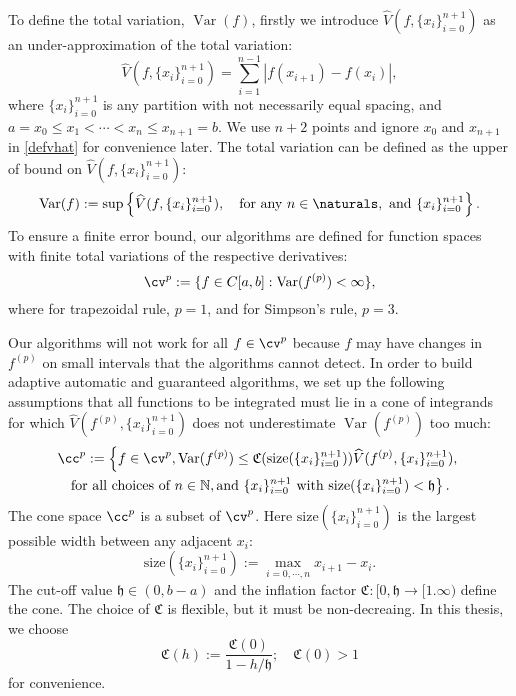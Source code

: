 \documentclass{iitthesis}
\DeclareMathOperator{\Var}{Var}
\theoremstyle{definition}
\theoremstyle{remark}
\begin{document}
To define the total variation, $\Var(f)$, firstly we introduce $\widehat{V}(f,\{x_i\}_{i=0}^{n+1})$ as an under-approximation of the total variation:
\begin{equation}\label{defvhat}
    \widehat{V}(f,\{x_i\}_{i=0}^{n+1})=\sum_{i=1}^{n-1}|f(x_{i+1})-f(x_{i})|,
\end{equation}
where $\{x_i\}_{i=0}^{n+1}$ is any partition with not necessarily equal spacing, and $a=x_{0}\leq x_{1}<\cdots<x_{n}\leq x_{n+1}=b$.
We use $n+2$ points and ignore $x_0$ and $x_{n+1}$ in \eqref{defvhat} for convenience later.
The total variation can be defined as the upper of bound on $\widehat{V}(f,\{x_i\}_{i=0}^{n+1})$:
\begin{equation}\label{defvar}
  \Var(f) := \sup \left\{\widehat{V}(f,\{x_i\}_{i=0}^{n+1}), \quad \text{for any }n \in \naturals, \text{ and } \{x_i\}_{i=0}^{n+1}\right\}.
\end{equation}
To ensure a finite error bound, our algorithms are defined for function spaces with finite total variations of the respective derivatives:
\begin{equation}\label{defspace}
 \cv^{p}:=\{f\in C[a,b]: \Var(f^{(p)}) < \infty \},
\end{equation}
where for trapezoidal rule, $p=1$, and for Simpson's rule, $p=3$.

Our algorithms will not work for all $f \in \cv^{p}$ because $f$ may have changes in $f^{(p)}$ on small intervals that the algorithms cannot detect. In order to build adaptive automatic and guaranteed algorithms, we set up the following assumptions that all functions to be integrated must lie in a cone of integrands for which $\widehat{V}(f^{(p)},\{x_i\}_{i=0}^{n+1})$ does not underestimate $\Var(f^{(p)})$ too much:
\begin{multline}\label{defcone}
\cc^{p}:=\left\{f\in \cv^{p}, \Var(f^{(p)})\leq \mathfrak{C}(\text{size}(\{x_i\}_{i=0}^{n+1}))\widehat{V}(f^{(p)},\{x_i\}_{i=0}^{n+1}),\right.\\ \left.\text{for all choices of } n\in \mathbb{N}, \text{and }\{x_i\}_{i=0}^{n+1} \text{ with }\text{size}(\{x_i\}_{i=0}^{n+1})<\mathfrak{h}\right\}.
\end{multline}
The cone space $\cc^{p}$ is a subset of $\cv^{p}$. Here $\text{size}(\{x_i\}_{i=0}^{n+1})$ is the largest possible width between any adjacent $x_i$:
\begin{equation}\label{defsize}
  \text{size}(\{x_i\}_{i=0}^{n+1}):=\max_{i=0,\cdots, n} x_{i+1}-x_{i}.
\end{equation}
The cut-off value $\mathfrak{h} \in (0, b-a)$ and the inflation factor $\mathfrak{C}: [0,\mathfrak{h} \rightarrow [1.\infty)$ define the cone. The choice of $\mathfrak{C}$ is flexible, but it must be non-decreaing. In this thesis, we choose
\begin{equation}\label{definflationfactor}
  \mathfrak{C}(h):=\frac{\mathfrak{C}(0)}{1-h/\mathfrak{h}}; \quad \mathfrak{C}(0)>1
\end{equation}
for convenience.
\end{document}
